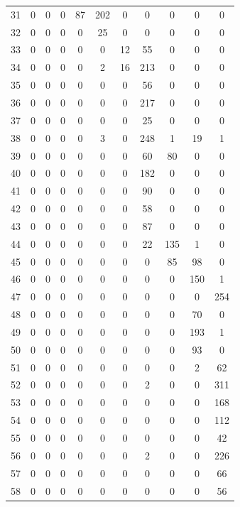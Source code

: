 \begin{longtable}[c]{|c|c|c|c|c|c|c|c|c|c|c|}
31 & 0 & 0 & 0 & 87 & 202 & 0 & 0 & 0 & 0 & 0\\
32 & 0 & 0 & 0 & 0 & 25 & 0 & 0 & 0 & 0 & 0\\
33 & 0 & 0 & 0 & 0 & 0 & 12 & 55 & 0 & 0 & 0\\
34 & 0 & 0 & 0 & 0 & 2 & 16 & 213 & 0 & 0 & 0\\
35 & 0 & 0 & 0 & 0 & 0 & 0 & 56 & 0 & 0 & 0\\
36 & 0 & 0 & 0 & 0 & 0 & 0 & 217 & 0 & 0 & 0\\
37 & 0 & 0 & 0 & 0 & 0 & 0 & 25 & 0 & 0 & 0\\
38 & 0 & 0 & 0 & 0 & 3 & 0 & 248 & 1 & 19 & 1\\
39 & 0 & 0 & 0 & 0 & 0 & 0 & 60 & 80 & 0 & 0\\
40 & 0 & 0 & 0 & 0 & 0 & 0 & 182 & 0 & 0 & 0\\
41 & 0 & 0 & 0 & 0 & 0 & 0 & 90 & 0 & 0 & 0\\
42 & 0 & 0 & 0 & 0 & 0 & 0 & 58 & 0 & 0 & 0\\
43 & 0 & 0 & 0 & 0 & 0 & 0 & 87 & 0 & 0 & 0\\
44 & 0 & 0 & 0 & 0 & 0 & 0 & 22 & 135 & 1 & 0\\
45 & 0 & 0 & 0 & 0 & 0 & 0 & 0 & 85 & 98 & 0\\
46 & 0 & 0 & 0 & 0 & 0 & 0 & 0 & 0 & 150 & 1\\
47 & 0 & 0 & 0 & 0 & 0 & 0 & 0 & 0 & 0 & 254\\
48 & 0 & 0 & 0 & 0 & 0 & 0 & 0 & 0 & 70 & 0\\
49 & 0 & 0 & 0 & 0 & 0 & 0 & 0 & 0 & 193 & 1\\
50 & 0 & 0 & 0 & 0 & 0 & 0 & 0 & 0 & 93 & 0\\
51 & 0 & 0 & 0 & 0 & 0 & 0 & 0 & 0 & 2 & 62\\
52 & 0 & 0 & 0 & 0 & 0 & 0 & 2 & 0 & 0 & 311\\
53 & 0 & 0 & 0 & 0 & 0 & 0 & 0 & 0 & 0 & 168\\
54 & 0 & 0 & 0 & 0 & 0 & 0 & 0 & 0 & 0 & 112\\
55 & 0 & 0 & 0 & 0 & 0 & 0 & 0 & 0 & 0 & 42\\
56 & 0 & 0 & 0 & 0 & 0 & 0 & 2 & 0 & 0 & 226\\
57 & 0 & 0 & 0 & 0 & 0 & 0 & 0 & 0 & 0 & 66\\
58 & 0 & 0 & 0 & 0 & 0 & 0 & 0 & 0 & 0 & 56\\

 \end{longtable}





